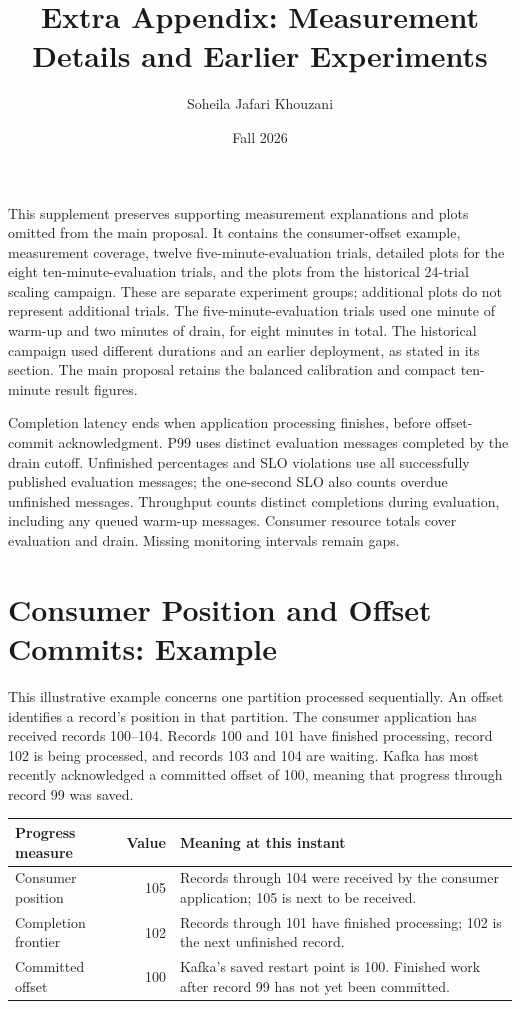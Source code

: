 \documentclass[10pt]{article}
\title{Extra Appendix: Measurement Details and Earlier Experiments}
\author{Soheila Jafari Khouzani}
\date{Fall 2026}
\begin{document}
\maketitle
This supplement preserves supporting measurement explanations and plots omitted from the main proposal. It contains the consumer-offset example, measurement coverage, twelve five-minute-evaluation trials, detailed plots for the eight ten-minute-evaluation trials, and the plots from the historical 24-trial scaling campaign. These are separate experiment groups; additional plots do not represent additional trials. The five-minute-evaluation trials used one minute of warm-up and two minutes of drain, for eight minutes in total. The historical campaign used different durations and an earlier deployment, as stated in its section. The main proposal retains the balanced calibration and compact ten-minute result figures.

Completion latency ends when application processing finishes, before offset-commit acknowledgment. P99 uses distinct evaluation messages completed by the drain cutoff. Unfinished percentages and SLO violations use all successfully published evaluation messages; the one-second SLO also counts overdue unfinished messages. Throughput counts distinct completions during evaluation, including any queued warm-up messages. Consumer resource totals cover evaluation and drain. Missing monitoring intervals remain gaps.
\clearpage
\section{Consumer Position and Offset Commits: Example}
\label{app:consumer-offset-example}
This illustrative example concerns one partition processed sequentially. An offset identifies a record's position in that partition. The consumer application has received records 100--104. Records 100 and 101 have finished processing, record 102 is being processed, and records 103 and 104 are waiting. Kafka has most recently acknowledged a committed offset of 100, meaning that progress through record 99 was saved.

\begin{center}
\small
\begin{tabularx}{\linewidth}{@{}>{\raggedright\arraybackslash}p{.29\linewidth}r>{\raggedright\arraybackslash}X@{}}
\toprule
Progress measure & Value & Meaning at this instant\\
\midrule
Consumer position & 105 & Records through 104 were received by the consumer application; 105 is next to be received.\\
Completion frontier & 102 & Records through 101 have finished processing; 102 is the next unfinished record.\\
Committed offset & 100 & Kafka's saved restart point is 100. Finished work after record 99 has not yet been committed.\\
\bottomrule
\end{tabularx}
\end{center}
\end{document}
